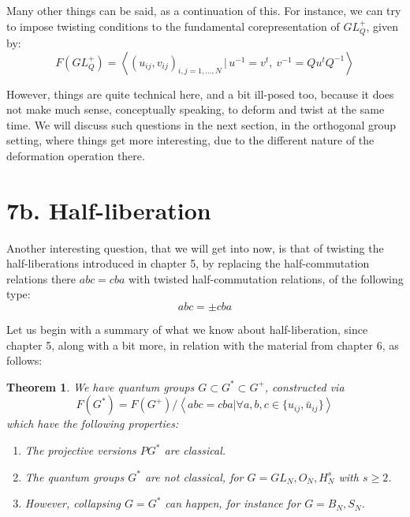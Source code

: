 \documentclass[12pt]{amsbook}
\newtheorem{theorem}{Theorem}[chapter]
\begin{document}
Many other things can be said, as a continuation of this. For instance, we can try to impose twisting conditions to the fundamental corepresentation of $GL_Q^+$, given by:
$$F(GL_Q^+)=\left<(u_{ij},v_{ij})_{i,j=1,\ldots,N}\,\Big|\,u^{-1}=v^t,\ v^{-1}=Qu^tQ^{-1}\right>$$

However, things are quite technical here, and a bit ill-posed too, because it does not make much sense, conceptually speaking, to deform and twist at the same time. We will discuss such questions in the next section, in the orthogonal group setting, where things get more interesting, due to the different nature of the deformation operation there.

\section*{7b. Half-liberation} 

Another interesting question, that we will get into now, is that of twisting the half-liberations introduced in chapter 5, by replacing the half-commutation relations there $abc=cba$ with twisted half-commutation relations, of the following type:
$$abc=\pm cba$$

Let us begin with a summary of what we know about half-liberation, since chapter 5, along with a bit more, in relation with the material from chapter 6, as follows:

\begin{theorem}
We have quantum groups $G\subset G^*\subset G^+$, constructed via
$$F(G^*)=F(G^+)\Big/\left<abc=cba\Big|\forall a,b,c\in\{u_{ij},\bar{u}_{ij}\}\right>$$
which have the following properties:
\begin{enumerate}
\item The projective versions $PG^*$ are classical.

\item The quantum groups $G^*$ are not classical, for $G=GL_N,O_N,H_N^s$ with $s\geq2$.

\item However, collapsing $G=G^*$ can happen, for instance for $G=B_N,S_N$.
\end{enumerate}
\end{theorem}
\end{document}
